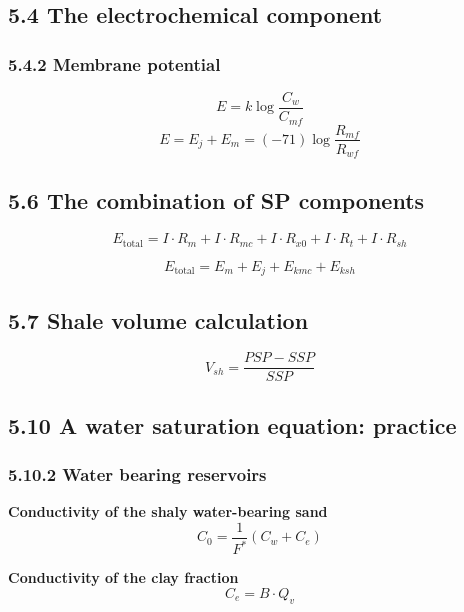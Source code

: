 \subsection{5.4 The electrochemical component}
\subsubsection{5.4.2 Membrane potential}
\begin{equation*}
    E = k\log\frac{C_w}{C_{mf}}\tag{5.22}
\end{equation*}
\begin{equation*}
    E = E_j + E_m = (-71)\log\frac{R_{mf}}{R_{wf}}\tag{5.23}
\end{equation*}

\subsection{5.6 The combination of SP components}
\begin{equation*}
    E_\mathrm{total} = I\cdot R_m + I\cdot R_{mc} + I\cdot R_{x0} + I\cdot R_t + I\cdot R_{sh}\tag{5.24}
\end{equation*}

\begin{equation*}
    E_\mathrm{total} = E_m + E_j + E_{kmc} + E_{ksh}\tag{5.25}
\end{equation*}

\subsection{5.7 Shale volume calculation}
\begin{equation*}
    V_{sh} = \frac{PSP - SSP}{SSP}
\end{equation*}

\subsection{5.10 A water saturation equation: practice}
\subsubsection{5.10.2 Water bearing reservoirs}
\textbf{Conductivity of the shaly water-bearing sand}
\begin{equation*}
    C_0 = \frac{1}{F^\ast}\left( C_w + C_e \right)\tag{5.27}
\end{equation*}

\textbf{Conductivity of the clay fraction}
\begin{equation*}
    C_e = B\cdot Q_v\tag{5.28}
\end{equation*}

